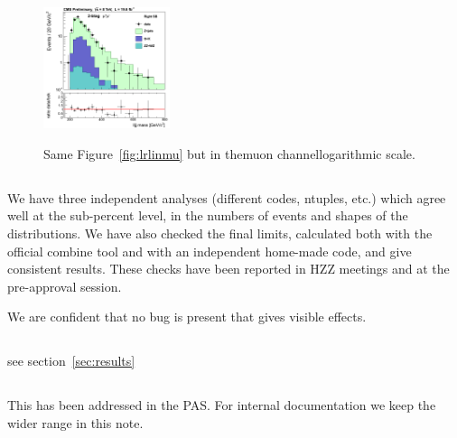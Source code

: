 \begin{figure}[htb]
{\includegraphics[width=0.33\textwidth]{plots/approvalxchecks/Right_2b_mm.png}
}
\caption{Same Figure~\ref{fig:lrlinmu} but in themuon channellogarithmic scale.
\label{fig:lrlogmu}
}
\end{figure}


\subsection{}
We have three independent analyses (different codes, ntuples, etc.) which agree 
well at the sub-percent level, in the numbers of events and shapes of the 
distributions. We have also checked the final limits, calculated both with the 
official combine tool and with an independent home-made code, and give 
consistent results. These checks have been reported in HZZ meetings and at the 
pre-approval session.

We are confident that no bug is present that gives visible effects.

\subsection{}
see section~\ref{sec:results}

\subsection{}
This has been addressed in the PAS. For internal documentation we keep the wider range in this note.


